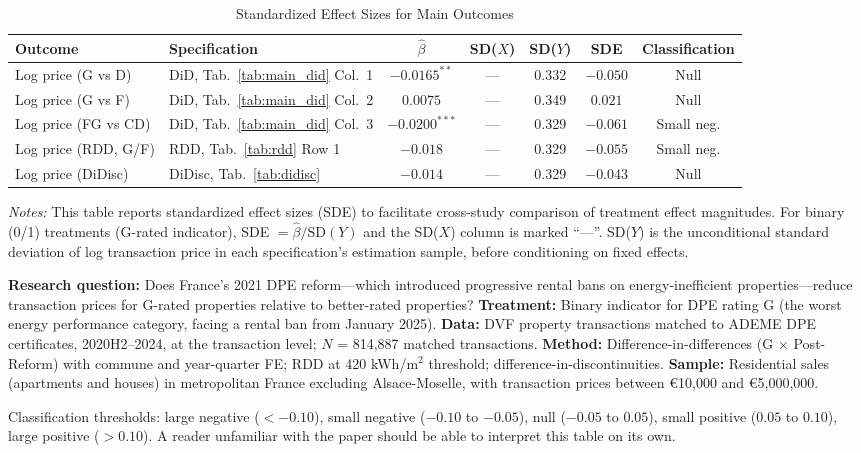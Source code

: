 \documentclass[12pt]{article}
\begin{document}
\begin{table}[H]
\centering
\caption{Standardized Effect Sizes for Main Outcomes}
\label{tab:sde}
\begin{adjustbox}{max width=\textwidth}
\begin{tabular}{llccccc}
\toprule
Outcome & Specification & $\hat{\beta}$ & SD($X$) & SD($Y$) & SDE & Classification \\
\midrule
Log price (G vs D) & DiD, Tab.~\ref{tab:main_did} Col.\ 1 & $-0.0165^{**}$ & --- & 0.332 & $-0.050$ & Null \\
Log price (G vs F) & DiD, Tab.~\ref{tab:main_did} Col.\ 2 & $0.0075$ & --- & 0.349 & $0.021$ & Null \\
Log price (FG vs CD) & DiD, Tab.~\ref{tab:main_did} Col.\ 3 & $-0.0200^{***}$ & --- & 0.329 & $-0.061$ & Small neg. \\
Log price (RDD, G/F) & RDD, Tab.~\ref{tab:rdd} Row 1 & $-0.018$ & --- & 0.329 & $-0.055$ & Small neg. \\
Log price (DiDisc) & DiDisc, Tab.~\ref{tab:didisc} & $-0.014$ & --- & 0.329 & $-0.043$ & Null \\
\bottomrule
\end{tabular}
\end{adjustbox}
\par\vspace{0.3em}
{\footnotesize \emph{Notes:} This table reports standardized effect sizes (SDE)
to facilitate cross-study comparison of treatment effect magnitudes.
For binary (0/1) treatments (G-rated indicator), SDE $= \hat{\beta} / \text{SD}(Y)$ and the SD($X$)
column is marked ``---''.
SD($Y$) is the unconditional standard deviation of log transaction price
in each specification's estimation sample, before conditioning on fixed effects.

\textbf{Research question:} Does France's 2021 DPE reform---which introduced progressive rental bans on energy-inefficient properties---reduce transaction prices for G-rated properties relative to better-rated properties?
\textbf{Treatment:} Binary indicator for DPE rating G (the worst energy performance category, facing a rental ban from January 2025).
\textbf{Data:} DVF property transactions matched to ADEME DPE certificates, 2020H2--2024, at the transaction level; $N$ = 814,887 matched transactions.
\textbf{Method:} Difference-in-differences (G $\times$ Post-Reform) with commune and year-quarter FE; RDD at 420 kWh/m$^2$ threshold; difference-in-discontinuities.
\textbf{Sample:} Residential sales (apartments and houses) in metropolitan France excluding Alsace-Moselle, with transaction prices between \euro{}10,000 and \euro{}5,000,000.

Classification thresholds:
large negative ($< -0.10$), small negative ($-0.10$ to $-0.05$),
null ($-0.05$ to $0.05$), small positive ($0.05$ to $0.10$),
large positive ($> 0.10$).
A reader unfamiliar with the paper should be able to interpret this table
on its own.}
\end{table}
\end{document}
